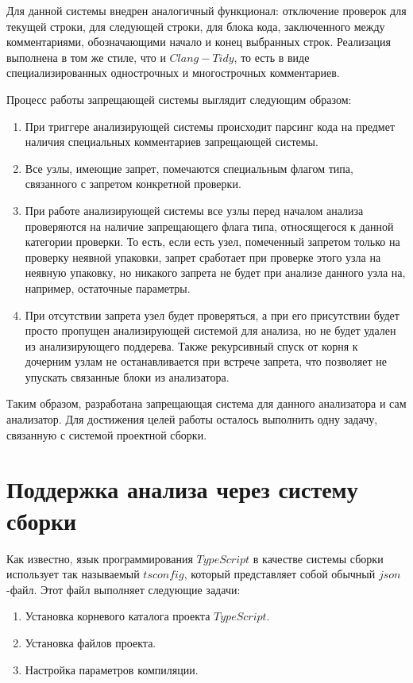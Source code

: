 \documentclass{mipt-thesis-bs}
\begin{document}
Для данной системы внедрен аналогичный функционал: отключение проверок для текущей строки, для 
следующей строки, для блока кода, заключенного между комментариями, обозначающими начало и конец 
выбранных строк. Реализация выполнена в том же стиле, что и $Clang-Tidy$, то есть в виде 
специализированных однострочных и многострочных комментариев.

Процесс работы запрещающей системы выглядит следующим образом:
\begin{enumerate}
    \item При триггере анализирующей системы происходит парсинг кода на предмет наличия специальных 
    комментариев запрещающей системы.
    \item Все узлы, имеющие запрет, помечаются специальным флагом типа, связанного с запретом конкретной проверки.
    \item При работе анализирующей системы все узлы перед началом анализа проверяются на наличие запрещающего флага типа, 
    относящегося к данной категории проверки. То есть, если есть узел, помеченный запретом только на проверку неявной упаковки, 
    запрет сработает при проверке этого узла на неявную упаковку, но никакого запрета не будет при анализе данного узла на, 
    например, остаточные параметры.
    \item При отсутствии запрета узел будет проверяться, а при его присутствии будет просто пропущен анализирующей системой 
    для анализа, но не будет удален из анализирующего поддерева. Также рекурсивный спуск от корня к дочерним узлам не 
    останавливается при встрече запрета, что позволяет не упускать связанные блоки из анализатора.
\end{enumerate}

Таким образом, разработана запрещающая система для данного анализатора и сам анализатор. Для достижения целей работы 
осталось выполнить одну задачу, связанную с системой проектной сборки.

\section{Поддержка анализа через систему сборки}

Как известно, язык программирования $TypeScript$ в качестве системы сборки использует так называемый 
$tsconfig$, который представляет собой обычный $json$-файл. Этот файл выполняет следующие задачи:

\begin{enumerate}
    \item Установка корневого каталога проекта $TypeScript$.
    \item Установка файлов проекта.
    \item Настройка параметров компиляции.
\end{enumerate}
\end{document}
